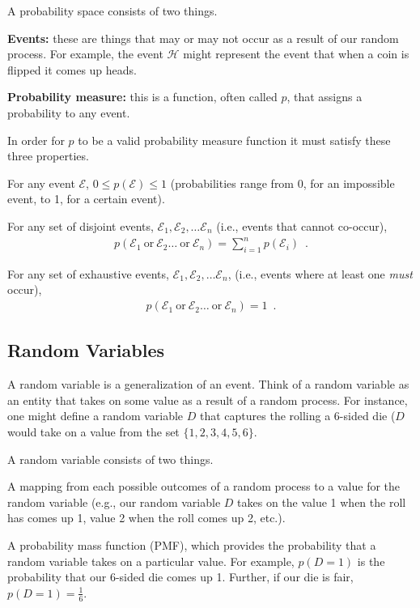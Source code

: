 \documentclass{tufte-handout}
\begin{document}
A probability space consists of two things.
\bi
\item \textbf{Events:} these are things that may or may not occur as a result of our random process.  For example, the event $\mathcal{H}$ might represent the event that when a coin is flipped it comes up heads.
\item \textbf{Probability measure:} this is a function, often called $p$, that assigns a probability to any event.
\ei

In order for $p$ to be a valid probability measure function it must satisfy these three properties.
\be
\item For any event $\mathcal{E}$, $0 \leq p(\mathcal{E}) \leq 1$ (probabilities range from 0, for an impossible event, to 1, for a certain event).
\item For any set of disjoint events, $\mathcal{E}_1, \mathcal{E}_2, \ldots \mathcal{E}_n$ (i.e., events that cannot co-occur),
\begin{align}
p(\mathcal{E}_1~\mbox{or}~\mathcal{E}_2 \ldots ~\mbox{or}~\mathcal{E}_n) = \sum_{i=1}^n p(\mathcal{E}_i) \enspace .
\end{align}
\item For any set of exhaustive events, $\mathcal{E}_1, \mathcal{E}_2, \ldots \mathcal{E}_n$, (i.e., events where at least one \emph{must} occur),
\begin{align}
p(\mathcal{E}_1~\mbox{or}~\mathcal{E}_2 \ldots ~\mbox{or}~\mathcal{E}_n) = 1 \enspace .
\end{align}

\ee

\subsection{Random Variables}
A random variable is a generalization of an event.  Think of a random variable as an entity that takes on some value as a result of a random process.  For instance, one might define a random variable $D$ that captures the rolling a 6-sided die ($D$ would take on a value from the set $\{1, 2, 3, 4, 5, 6\}$.

A random variable consists of two things.
\bi
\item A mapping from each possible outcomes of a random process to a value for the random variable (e.g., our random variable $D$ takes on the value 1 when the roll has comes up 1, value 2 when the roll comes up 2, etc.).
\item A probability mass function (PMF), which provides the probability that a random variable takes on a particular value.  For example, $p(D = 1)$ is the probability that our 6-sided die comes up 1.  Further, if our die is fair, $p(D=1)=\frac{1}{6}$.
\ei
\end{document}
